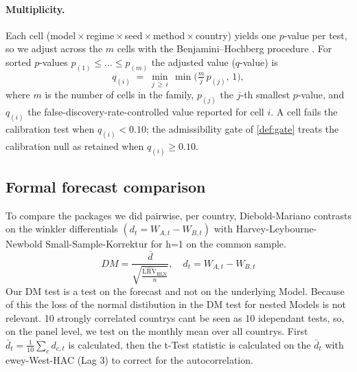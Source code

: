 \paragraph{Multiplicity.}
Each cell (model\,$\times$\,regime\,$\times$\,seed\,$\times$\,method\,$\times$\,country)
yields one $p$-value per test, so we adjust across the $m$ cells with the
Benjamini--Hochberg procedure \parencite{benjamini1995fdr}. For sorted
$p$-values $p_{(1)}\le\dots\le p_{(m)}$ the adjusted value ($q$-value) is
\begin{equation}
  q_{(i)} \;=\; \min_{j\,\ge\, i}\,
  \min\!\Big(\tfrac{m}{j}\,p_{(j)},\,1\Big),
  \label{eq:bhfdr}
\end{equation}
where $m$ is the number of cells in the family, $p_{(j)}$ the $j$-th smallest
$p$-value, and $q_{(i)}$ the false-discovery-rate-controlled value reported for
cell $i$. A cell fails the calibration test when $q_{(i)} < 0.10$; the
admissibility gate of \cref{def:gate} treats the calibration null as retained
when $q_{(i)}\ge 0.10$.
\subsection{Formal forecast comparison}
\label{sec:eval:comparison}
%
To compare the packages we did pairwise, per country, Diebold-Mariano contrasts on the winkler differentials $(d_t = W_{A,t} - W_{B,t})$ with Harvey-Leybourne-Newbold Small-Sample-Korrektur for h=1 on the common sample.
$$DM = \frac{\bar{d}}{\sqrt{\frac{\widehat{\text{LRV}}_{\text{HLN}}}{n}}}, \quad d_t = W_{A,t} - W_{B,t}$$Our DM test is a test on the forecast and not on the underlying Model. Because of this the loss of the normal distibution in the DM test for nested Models is not relevant. 10 strongly correlated countrys cant be seen as 10 idependant tests, so, on the panel level, we test on the monthly mean over all countrys. First $\bar{d}_t = \frac{1}{10} \sum_c d_{c,t}$ is calculated, then the t-Test statistic is calculated on the $\bar{d}_t$ with ewey-West-HAC (Lag 3) to correct for the autocorrelation. \\

